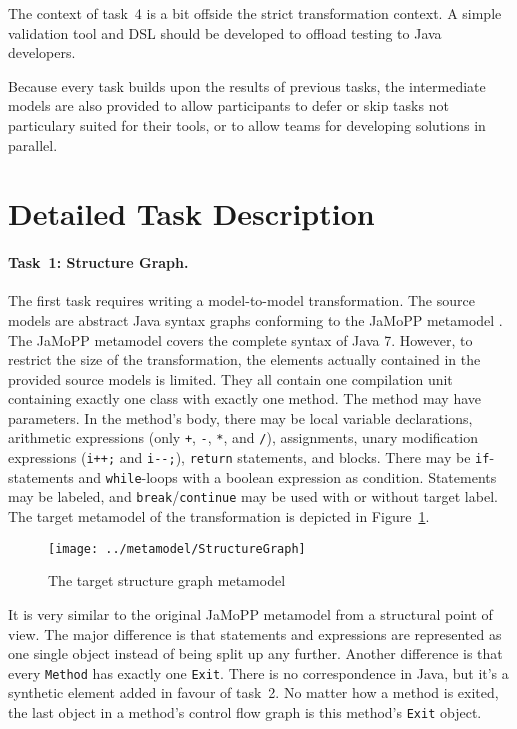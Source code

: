 \documentclass[submission]{eptcs}
\begin{document}
The context of task~4 is a bit offside the strict transformation context.  A
simple validation tool and DSL should be developed to offload testing to Java
developers.

Because every task builds upon the results of previous tasks, the intermediate
models are also provided to allow participants to defer or skip tasks not
particulary suited for their tools, or to allow teams for developing solutions
in parallel.

\section{Detailed Task Description}
\label{sec:task-descr}

\paragraph{Task~1: Structure Graph.}
\label{sec:task1-structure-graph}

The first task requires writing a model-to-model transformation.  The source
models are abstract Java syntax graphs conforming to the JaMoPP metamodel
\cite{jamopp09}.  The JaMoPP metamodel covers the complete syntax of Java 7.
However, to restrict the size of the transformation, the elements actually
contained in the provided source models is limited.  They all contain one
compilation unit containing exactly one class with exactly one method.  The
method may have parameters.  In the method's body, there may be local variable
declarations, arithmetic expressions (only \verb|+|, \verb|-|, \verb|*|, and
\verb|/|), assignments, unary modification expressions (\verb|i++;| and
\verb|i--;|), \verb|return| statements, and blocks.  There may be
\verb|if|-statements and \verb|while|-loops with a boolean expression as
condition.  Statements may be labeled, and \verb|break|/\verb|continue| may be
used with or without target label.  The target metamodel of the transformation
is depicted in Figure~\ref{fig:structure-graph-mm}.

\begin{figure}[h!]
  \centering
  \texttt{[image: ../metamodel/StructureGraph]}
  \caption{The target structure graph metamodel}
  \label{fig:structure-graph-mm}
\end{figure}

It is very similar to the original JaMoPP metamodel from a structural point of
view.  The major difference is that statements and expressions are represented
as one single object instead of being split up any further.  Another difference
is that every \verb|Method| has exactly one \verb|Exit|.  There is no
correspondence in Java, but it's a synthetic element added in favour of task~2.
No matter how a method is exited, the last object in a method's control flow
graph is this method's \verb|Exit| object.
\end{document}
